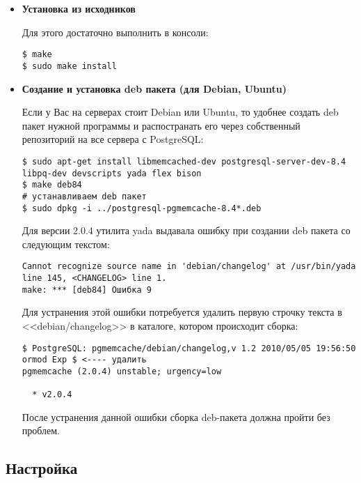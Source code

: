 \begin{itemize}
  \item \textbf{Установка из исходников}

Для этого достаточно выполнить в консоли:

\begin{lstlisting}[label=lst:pgcache1,caption=Установка из исходников]
$ make
$ sudo make install
\end{lstlisting}

  \item \textbf{Создание и установка deb пакета (для Debian, Ubuntu)}

Если у Вас на серверах стоит Debian или Ubuntu, то удобнее создать deb пакет нужной программы и распостранать его через собственный репозиторий на все сервера с PostgreSQL:

\begin{lstlisting}[label=lst:pgcache2,caption=Создание и установка deb пакета]
$ sudo apt-get install libmemcached-dev postgresql-server-dev-8.4 libpq-dev devscripts yada flex bison
$ make deb84
# устанавливаем deb пакет
$ sudo dpkg -i ../postgresql-pgmemcache-8.4*.deb
\end{lstlisting}

Для версии 2.0.4 утилита yada выдавала ошибку при создании deb пакета со следующим текстом:

\begin{lstlisting}[label=lst:pgcache3,caption=Создание и установка deb пакета]
Cannot recognize source name in 'debian/changelog' at /usr/bin/yada line 145, <CHANGELOG> line 1.
make: *** [deb84] Ошибка 9
\end{lstlisting}

Для устранения этой ошибки потребуется удалить первую строчку текста в <<debian/changelog>> в каталоге, котором происходит сборка:

\begin{lstlisting}[label=lst:pgcache4,caption=Создание и установка deb пакета]
$ PostgreSQL: pgmemcache/debian/changelog,v 1.2 2010/05/05 19:56:50 ormod Exp $ <---- удалить
pgmemcache (2.0.4) unstable; urgency=low

  * v2.0.4
\end{lstlisting}

После устранения данной ошибки сборка deb-пакета должна пройти без проблем.

\end{itemize}


\subsection{Настройка}

